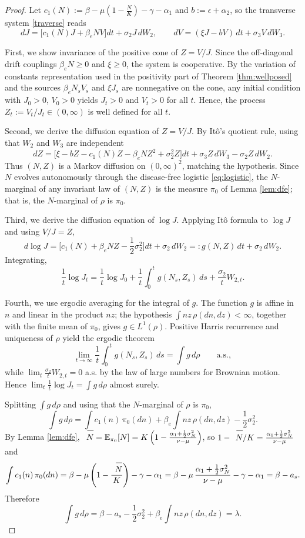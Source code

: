 \documentclass[12pt,a4paper,reqno]{amsart}
\theoremstyle{definition}
\theoremstyle{remark}
\theoremstyle{plain}
\let\svoverline\overline
\newcommand{\uc}[1]{\mkern 5mu\svoverline{\mkern-1mu#1\mkern-0.3mu \rule{0pt}{3.5mm}}\mkern 0mu}
\let\overline\uc
\begin{document}
\begin{proof}
Let $c_1(N):=\beta-\mu\left(1-\frac{N}{K}\right)-\gamma-\alpha_1$ and $b:=\epsilon+\alpha_2$, so the transverse system \eqref{traverse} reads
$$
dJ=\big[c_1(N)J+\beta_e NV\big]dt+\sigma_2 J\,dW_2,
\qquad
dV=(\xi J-bV)\,dt+\sigma_3 V\,dW_3 .
$$

First, we show invariance of the positive cone of $Z=V/J$. Since the off-diagonal drift couplings $\beta_e N\ge0$ and $\xi\ge0$, the system is cooperative. By the variation of constants representation used in the positivity part of Theorem \ref{thm:wellposed} and the sources $\beta_e N_sV_s$ and $\xi J_s$ are nonnegative on the cone, any initial condition with $J_0>0$, $V_0>0$ yields $J_t>0$ and $V_t>0$ for all $t$. Hence, the process $Z_t:=V_t/J_t\in(0,\infty)$ is well defined for all $t$.

Second, we derive the diffusion equation of $Z=V/J$. By It\^o's quotient rule, using that $W_2$ and $W_3$ are independent 
$$
dZ=\big[\xi-bZ-c_1(N)Z-\beta_e NZ^2+\sigma_2^2 Z\big]dt
   +\sigma_3 Z\,dW_3-\sigma_2 Z\,dW_2 .
$$
Thus $(N,Z)$ is a Markov diffusion on $(0,\infty)^2$, matching the hypothesis. Since $N$ evolves autonomously through the disease-free logistic \eqref{eq:logistic}, the $N$-marginal of any invariant law of $(N,Z)$ is the measure $\pi_0$ of Lemma \ref{lem:dfe}; that is, the $N$-marginal of $\rho$ is $\pi_0$.

Third, we derive the diffusion equation of $\log J$. Applying It\^o formula to $\log J$ and using $V/J=Z$,
$$
d\log J=\Big[c_1(N)+\beta_e NZ-\frac12\sigma_2^2\Big]dt+\sigma_2\,dW_2
=:g(N,Z)\,dt+\sigma_2\,dW_2 .
$$
Integrating,
$$
\frac1t\log J_t
=\frac1t\log J_0
+\frac1t\int_0^t g(N_s,Z_s)\,ds
+\frac{\sigma_2}{t}W_{2,t}.
$$

Fourth, we use ergodic averaging for the integral of $g$. The function $g$ is affine in $n$ and linear in the product $nz$; the hypothesis $\int nz\,\rho(dn,dz)<\infty$, together with the finite mean of $\pi_0$, gives $g\in L^1(\rho)$. Positive Harris recurrence and uniqueness of $\rho$ yield the ergodic theorem
$$
\lim_{t\to\infty} \frac1t\int_0^t g(N_s,Z_s)\,ds
=\int g\,d\rho
\qquad\text{a.s.},
$$
while $\lim_t \frac{\sigma_2}{t}W_{2,t}=0$ a.s. by the law of large numbers for Brownian motion. Hence $\lim_t \frac1t\log J_t=\int g\,d\rho$ almost surely.

Splitting $\int g\,d\rho$ and using that the $N$-marginal of $\rho$ is $\pi_0$,
$$
\int g\,d\rho
=\int c_1(n)\,\pi_0(dn)
+\beta_e\int nz\,\rho(dn,dz)
-\frac12\sigma_2^2 .
$$
By Lemma \ref{lem:dfe}, $\overline N=\mathbb E_{\pi_0}[N]
=K\left(1-\frac{\alpha_1+\frac12\sigma_N^2}{\nu-\mu}\right)$, so
$1-\overline N/K=\frac{\alpha_1+\frac12\sigma_N^2}{\nu-\mu}$ and
$$
\int c_1(n)\,\pi_0(dn)
=\beta-\mu\left(1-\frac{\overline N}{K}\right)-\gamma-\alpha_1
=\beta-\mu\,\frac{\alpha_1+\frac12\sigma_N^2}{\nu-\mu}-\gamma-\alpha_1
=\beta-a_s.
$$
Therefore
$$
\int g\,d\rho=\beta-a_s-\frac12\sigma_2^2+\beta_e\int nz\,\rho(dn,dz)=\lambda .
$$


\end{proof}
\end{document}
